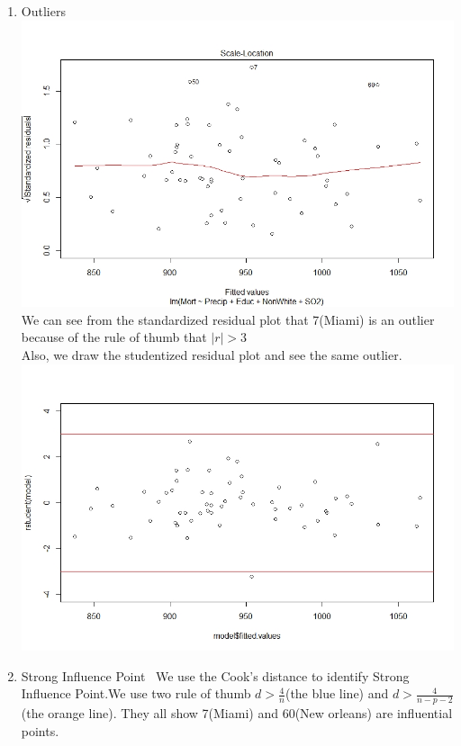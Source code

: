 \documentclass[12pt,a4paper]{article}
\begin{document}
\begin{enumerate}
\item{Outliers}~{}
\newline
\includegraphics[scale=0.6]{3.jpeg}
\newline
We can see from the standardized residual plot that 7(Miami) is an outlier because of the rule of thumb that $\vert{r}\vert>3$\\
\newline
Also, we draw the studentized residual plot and see the same outlier.
\newline
\includegraphics[scale=0.6]{rstu.jpeg}
\item{Strong Influence Point}~{}
\newline
We use the Cook's distance to identify Strong Influence Point.We use two rule of thumb $d>\frac{4}{n}$(the blue line) and $d>\frac{4}{n-p-2}$(the orange line). They all show 7(Miami) and 60(New orleans) are influential points. \\

\end{enumerate}
\end{document}
